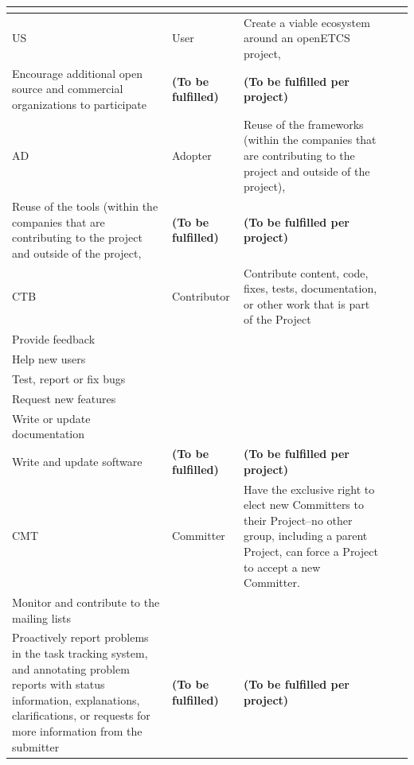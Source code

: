 \documentclass{template/openetcs_article}
\begin{document}
\begin{landscape}
\begin{flushleft}
\begin{supertabular}[H]{|m{1cm}|m{3cm}|m{12cm}|m{4,5cm}|m{4,5cm}|}
\begin{description}
\end{description}
\\\hline
US &
User &
\raggedright
Create a viable ecosystem around an openETCS project,\\
Encourage additional open source and commercial organizations to participate
&
\textbf{(To be fulfilled)} &
\textbf{(To be fulfilled per project)} \\\hline
AD &
Adopter &
\raggedright
Reuse of the frameworks (within the companies that are contributing to the project and outside of the project),\\
Reuse of the tools (within the companies that are contributing to the project and outside of the project,
&
\textbf{(To be fulfilled)} &
\textbf{(To be fulfilled per project)} \\\hline
CTB &
Contributor &
\raggedright
Contribute content, code, fixes, tests, documentation, or other work that is part of the Project\\
Provide feedback\\
Help new users\\
Test, report or fix bugs\\
Request new features\\
Write or update documentation\\
Write and update software
&
\textbf{(To be fulfilled)} &
\textbf{(To be fulfilled per project)} \\\hline
CMT &
Committer &
\raggedright
Have the exclusive right to elect new Committers to their Project–no other group, including a parent Project, can force a Project to accept a new Committer.\\
Monitor and contribute to the mailing lists\\
Proactively report problems in the task tracking system, and annotating problem reports with status information, explanations, clarifications, or requests for more information from the submitter
&
\textbf{(To be fulfilled)} &
\textbf{(To be fulfilled per project)} \\\hline
\end{supertabular}
\end{flushleft}




\end{landscape}
\end{document}
